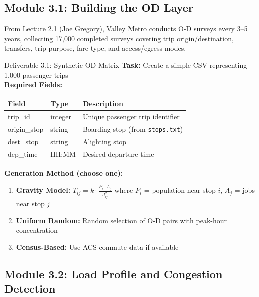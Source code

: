 \documentclass[11pt,letterpaper]{article}
\begin{document}
\subsection{Module 3.1: Building the OD Layer}

From Lecture 2.1 (Joe Gregory), Valley Metro conducts O-D surveys every 3--5 years, collecting 17,000 completed surveys covering trip origin/destination, transfers, trip purpose, fare type, and access/egress modes.

\begin{deliverablebox}{Deliverable 3.1: Synthetic OD Matrix}
\textbf{Task:} Create a simple CSV representing 1,000 passenger trips\\[0.2cm]
\textbf{Required Fields:}
\begin{center}
\begin{tabular}{lll}
\toprule
\textbf{Field} & \textbf{Type} & \textbf{Description} \\
\midrule
trip\_id & integer & Unique passenger trip identifier \\
origin\_stop & string & Boarding stop (from \texttt{stops.txt}) \\
dest\_stop & string & Alighting stop \\
dep\_time & HH:MM & Desired departure time \\
\bottomrule
\end{tabular}
\end{center}

\textbf{Generation Method (choose one):}
\begin{enumerate}[nosep]
    \item \textbf{Gravity Model:} $T_{ij} = k \cdot \frac{P_i \cdot A_j}{d_{ij}^2}$ where $P_i$ = population near stop $i$, $A_j$ = jobs near stop $j$
    \item \textbf{Uniform Random:} Random selection of O-D pairs with peak-hour concentration
    \item \textbf{Census-Based:} Use ACS commute data if available
\end{enumerate}
\end{deliverablebox}

\subsection{Module 3.2: Load Profile and Congestion Detection}
\end{document}
